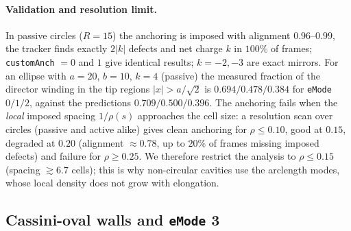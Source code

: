 \paragraph{Validation and resolution limit.} In passive circles ($R=15$) the anchoring is imposed with
alignment $0.96$--$0.99$, the tracker finds exactly $2|k|$ defects and net charge $k$ in $100\%$ of frames;
\texttt{customAnch} $=0$ and $1$ give identical results; $k=-2,-3$ are exact mirrors.
For an ellipse with $a=20$, $b=10$, $k=4$ (passive) the measured fraction of the director winding in
the tip regions $|x|>a/\sqrt2$ is $0.694/0.478/0.384$ for \texttt{eMode} $0/1/2$, against the predictions
$0.709/0.500/0.396$. The anchoring fails when the \emph{local} imposed spacing $1/\rho(s)$ approaches the
cell size: a resolution scan over circles (passive and active alike) gives clean anchoring for
$\rho\le0.10$, good at $0.15$, degraded at $0.20$ (alignment $\approx0.78$, up to $20\%$ of frames
missing imposed defects) and failure for $\rho\ge0.25$. We therefore restrict the analysis to
$\rho\le0.15$ (spacing $\gtrsim6.7$ cells); this is why non-circular cavities use the arclength modes,
whose local density does not grow with elongation.

\subsection{Cassini-oval walls and \texttt{eMode} 3}
\label{sec:md-cassini}

